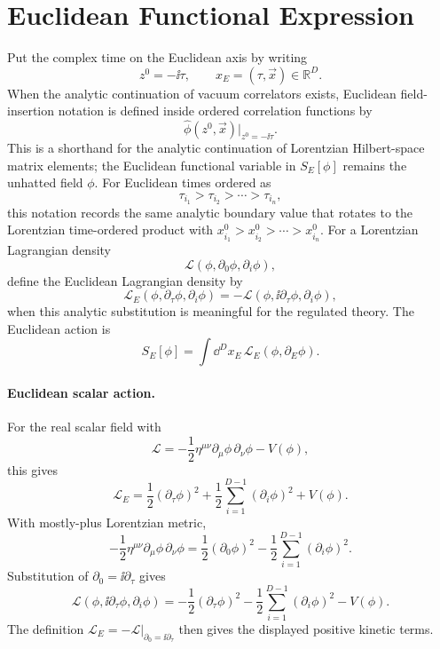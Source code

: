 \section{Euclidean Functional Expression}

\begin{definition}
\label{def:euclidean-continuation-scalar-lagrangian}
Put the complex time on the Euclidean axis by writing
\[
  z^0=-\ii\tau,
  \qquad
  x_E=(\tau,\vec x)\in\mathbb R^D.
\]
When the analytic continuation of vacuum correlators exists, Euclidean
field-insertion notation is defined inside ordered correlation functions by
\[
  \widehat\phi(z^0,\vec x)\big|_{z^0=-\ii\tau}.
\]
This is a shorthand for the analytic continuation of Lorentzian Hilbert-space
matrix elements; the Euclidean functional variable in \(S_E[\phi]\) remains the
unhatted field \(\phi\).  For Euclidean times ordered as
\[
  \tau_{i_1}>\tau_{i_2}>\cdots>\tau_{i_n},
\]
this notation records the same analytic boundary value that rotates to the
Lorentzian time-ordered product with
\(x_{i_1}^0>x_{i_2}^0>\cdots>x_{i_n}^0\).
For a Lorentzian Lagrangian density
\[
  \mathcal L(\phi,\partial_0\phi,\partial_i\phi),
\]
define the Euclidean Lagrangian density by
\[
  \mathcal L_E(\phi,\partial_\tau\phi,\partial_i\phi)
  =
  -\mathcal L(\phi,\ii\partial_\tau\phi,\partial_i\phi),
\]
when this analytic substitution is meaningful for the regulated theory. The
Euclidean action is
\[
S_E[\phi]
  =
  \int\dd^Dx_E\,\mathcal L_E(\phi,\partial_E\phi).
\]
\end{definition}

\paragraph{Euclidean scalar action.}
For the real scalar field with
\[
  \mathcal L
  =
  -\frac12\eta^{\mu\nu}\partial_\mu\phi\,\partial_\nu\phi
  -
  V(\phi),
\]
this gives
\[
  \mathcal L_E
  =
  \frac12(\partial_\tau\phi)^2
  +
  \frac12\sum_{i=1}^{D-1}(\partial_i\phi)^2
  +
  V(\phi).
\]
With mostly-plus Lorentzian metric,
\[
  -\frac12\eta^{\mu\nu}\partial_\mu\phi\,\partial_\nu\phi
  =
  \frac12(\partial_0\phi)^2
  -
  \frac12\sum_{i=1}^{D-1}(\partial_i\phi)^2 .
\]
Substitution of \(\partial_0=\ii\partial_\tau\) gives
\[
  \mathcal L(\phi,\ii\partial_\tau\phi,\partial_i\phi)
  =
  -\frac12(\partial_\tau\phi)^2
  -
  \frac12\sum_{i=1}^{D-1}(\partial_i\phi)^2
  -
  V(\phi).
\]
The definition \(\mathcal L_E=-\mathcal L|_{\partial_0=\ii\partial_\tau}\)
then gives the displayed positive kinetic terms.

